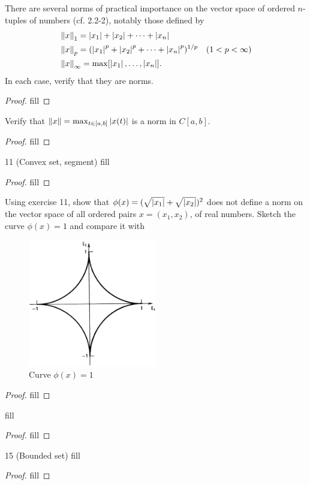 \begin{exercise}{8}
There are several norms of practical importance on the vector space of ordered $n$-tuples of numbers (cf. 2.2-2), notably those defined by
\begin{align*}
    &\left\lVert x\right\rVert_1 = \left\lvert x_1\right\rvert+\left\lvert x_2\right\rvert+\dots+\left\lvert x_n\right\rvert\\
    &\left\lVert x\right\rVert_p = (\left\lvert x_1\right\rvert^p+\left\lvert x_2\right\rvert^p+\dots+\left\lvert x_n\right\rvert^p)^{1/p}\quad (1<p<\infty)\\
    &\left\lVert x\right\rVert_\infty = \max[\left\lvert x_1\right\rvert,\dots,\left\lvert x_n\right\rvert].
\end{align*}
In each case, verify that they are norms.
\end{exercise}
\begin{proof}
fill
\end{proof}

\begin{exercise}{9}
Verify that $\left\lVert x\right\rVert=\max_{t\in [a,b]}\left\lvert x(t)\right\rvert$ is a norm in $C[a,b]$.
\end{exercise}
\begin{proof}
fill
\end{proof}

\begin{exercise}{11 (Convex set, segment)}
fill
\end{exercise}
\begin{proof}
fill
\end{proof}

\begin{exercise}{12}
Using exercise 11, show that $\phi(x)=(\sqrt{\left\lvert x_1\right\rvert}+\sqrt{\left\lvert x_2\right\rvert})^2$ does not define a norm on the vector space of all ordered pairs $x=(x_1,x_2)$, of real numbers. Sketch the curve $\phi(x)=1$ and compare it with 
\begin{figure}[H]
    \centering
    \includegraphics[width=0.5\textwidth]{kreyszig/assets/sec2-2-ex-12.png}
    \caption{Curve $\phi(x)=1$}
    \label{fig:sec2-2-ex12}
\end{figure}
\end{exercise}
\begin{proof}
fill
\end{proof}

\begin{exercise}{13}
fill
\end{exercise}
\begin{proof}
fill
\end{proof}

\begin{exercise}{15 (Bounded set)}
fill
\end{exercise}
\begin{proof}
fill
\end{proof}
